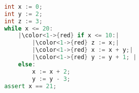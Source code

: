 \begin{lstlisting}[language=C++,basicstyle=\ttfamily,keywordstyle=\color{blue}, escapechar={|}]  % Start your code-block
	
	int x := 0;
	int y := 2;
	int z := 3;
	while x <= 20:
		|\color<1->{red} if x <= 10:|
			|\color<1->{red} z := x;|
			|\color<1->{red} x := x + y;|
			|\color<1->{red} y := y + 1; |
		else:
			x := x + 2;
			y := y - 3;
	assert x == 21;
	\end{lstlisting}